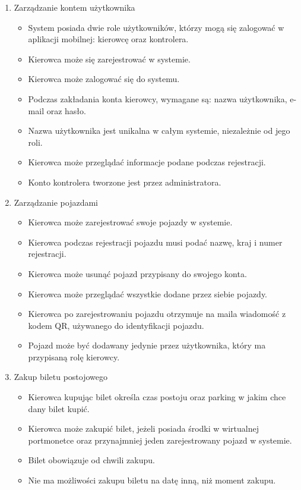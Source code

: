 \begin{enumerate}
	\item Zarządzanie kontem użytkownika
		\begin{itemize}
			\item System posiada dwie role użytkowników, którzy mogą się zalogować w aplikacji mobilnej: kierowcę oraz kontrolera.
			\item Kierowca może się zarejestrować w systemie.
			\item Kierowca może zalogować się do systemu.
			\item Podczas zakładania konta kierowcy, wymagane są: nazwa użytkownika, e-mail oraz hasło.
			\item Nazwa użytkownika jest unikalna w całym systemie, niezależnie od jego roli.
			\item Kierowca może przeglądać informacje podane podczas rejestracji.
			\item Konto kontrolera tworzone jest przez administratora.
		\end{itemize}
	\item Zarządzanie pojazdami
		\begin{itemize}
			\item Kierowca może zarejestrować swoje pojazdy w systemie.
			\item Kierowca podczas rejestracji pojazdu musi podać nazwę, kraj i numer rejestracji.
			\item Kierowca może usunąć pojazd przypisany do swojego konta.
			\item Kierowca może przeglądać wszystkie dodane przez siebie pojazdy.
			\item Kierowca po zarejestrowaniu pojazdu otrzymuje na maila wiadomość z kodem QR, używanego do identyfikacji pojazdu.
			\item Pojazd może być dodawany jedynie przez użytkownika, który ma przypisaną rolę kierowcy.
		\end{itemize}
	\item Zakup biletu postojowego
		\begin{itemize}
			\item Kierowca kupując bilet określa czas postoju oraz parking w jakim chce dany bilet kupić.
			\item Kierowca może zakupić bilet, jeżeli posiada środki w wirtualnej portmonetce oraz przynajmniej jeden zarejestrowany pojazd w systemie.
			\item Bilet obowiązuje od chwili zakupu.
			\item Nie ma możliwości zakupu biletu na datę inną, niż moment zakupu.

\end{itemize}
\end{enumerate}
